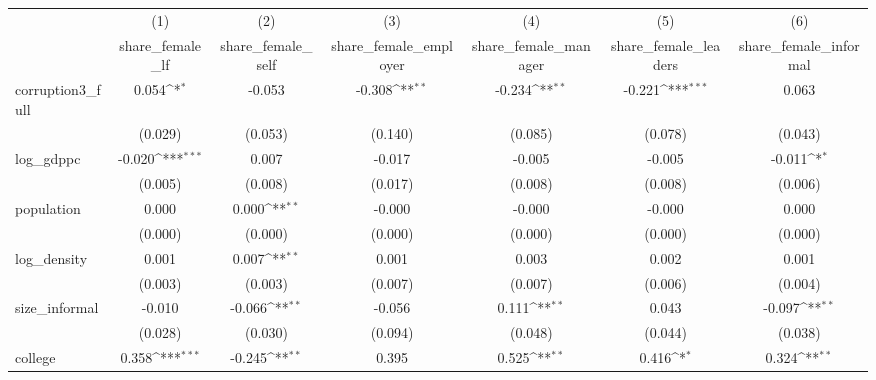 {
\def\sym#1{\ifmmode^{#1}\else\(^{#1}\)\fi}
\begin{tabular}{l*{6}{c}}
\hline\hline
            &\multicolumn{1}{c}{(1)}&\multicolumn{1}{c}{(2)}&\multicolumn{1}{c}{(3)}&\multicolumn{1}{c}{(4)}&\multicolumn{1}{c}{(5)}&\multicolumn{1}{c}{(6)}\\
            &\multicolumn{1}{c}{share\_female\_lf}&\multicolumn{1}{c}{share\_female\_self}&\multicolumn{1}{c}{share\_female\_employer}&\multicolumn{1}{c}{share\_female\_manager}&\multicolumn{1}{c}{share\_female\_leaders}&\multicolumn{1}{c}{share\_female\_informal}\\
\hline
corruption3\_full&       0.054\sym{*}  &      -0.053         &      -0.308\sym{**} &      -0.234\sym{**} &      -0.221\sym{***}&       0.063         \\
            &     (0.029)         &     (0.053)         &     (0.140)         &     (0.085)         &     (0.078)         &     (0.043)         \\
[1em]
log\_gdppc   &      -0.020\sym{***}&       0.007         &      -0.017         &      -0.005         &      -0.005         &      -0.011\sym{*}  \\
            &     (0.005)         &     (0.008)         &     (0.017)         &     (0.008)         &     (0.008)         &     (0.006)         \\
[1em]
population  &       0.000         &       0.000\sym{**} &      -0.000         &      -0.000         &      -0.000         &       0.000         \\
            &     (0.000)         &     (0.000)         &     (0.000)         &     (0.000)         &     (0.000)         &     (0.000)         \\
[1em]
log\_density &       0.001         &       0.007\sym{**} &       0.001         &       0.003         &       0.002         &       0.001         \\
            &     (0.003)         &     (0.003)         &     (0.007)         &     (0.007)         &     (0.006)         &     (0.004)         \\
[1em]
size\_informal&      -0.010         &      -0.066\sym{**} &      -0.056         &       0.111\sym{**} &       0.043         &      -0.097\sym{**} \\
            &     (0.028)         &     (0.030)         &     (0.094)         &     (0.048)         &     (0.044)         &     (0.038)         \\
[1em]
college     &       0.358\sym{***}&      -0.245\sym{**} &       0.395         &       0.525\sym{**} &       0.416\sym{*}  &       0.324\sym{**} \\

\end{tabular}}
